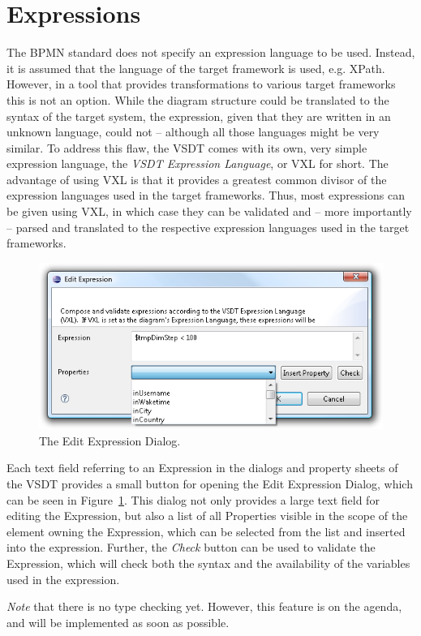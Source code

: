 \section{Expressions}
\label{sec:user_features_exp}

The BPMN standard does not specify an expression language to be used.  Instead,
it is assumed that the language of the target framework is used, e.g.  XPath.
However, in a tool that provides transformations to various target frameworks
this is not an option.  While the diagram structure could be translated to the
syntax of the target system, the expression, given that they are written in an
unknown language, could not -- although all those languages might be very similar.
To address this flaw, the VSDT comes with its own, very simple expression language,
the \emph{VSDT Expression Language}, or VXL for short.  The advantage of using
VXL is that it provides a greatest common divisor of the expression languages
used in the target frameworks.  Thus, most expressions can be given using VXL, in
which case they can be validated and -- more importantly -- parsed and translated
to the respective expression languages used in the target frameworks.

\begin{figure}[ht]
	\centering
	\includegraphics[width=.5\textwidth]{figures/features/editExp.png}
	\caption{The Edit Expression Dialog.}
	\label{fig:editExp}
\end{figure}

Each text field referring to an Expression in the dialogs and property sheets of
the VSDT provides a small button for opening the Edit Expression Dialog, which
can be seen in Figure~\ref{fig:editExp}.  This dialog not only provides a large
text field for editing the Expression, but also a list of all Properties visible
in the scope of the element owning the Expression, which can be selected from the
list and inserted into the expression.  Further, the \emph{Check} button can be
used to validate the Expression, which will check both the syntax and the
availability of the variables used in the expression.

\emph{Note} that there is no type checking yet.  However, this feature is on the
agenda, and will be implemented as soon as possible.


